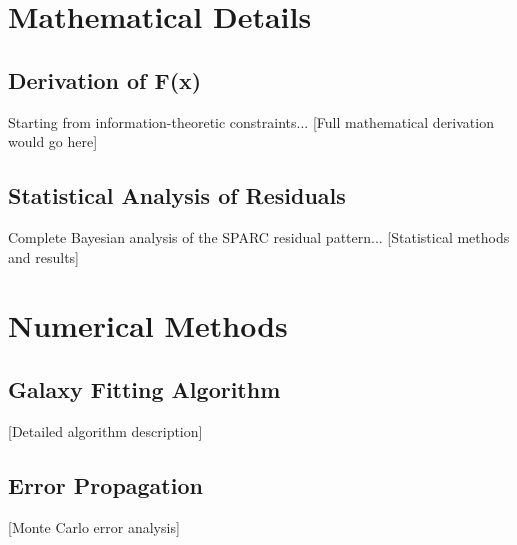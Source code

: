 \documentclass[12pt,a4paper]{article}
\begin{document}
\begin{appendices}

\section{Mathematical Details}

\subsection{Derivation of F(x)}

Starting from information-theoretic constraints...
[Full mathematical derivation would go here]

\subsection{Statistical Analysis of Residuals}

Complete Bayesian analysis of the SPARC residual pattern...
[Statistical methods and results]

\section{Numerical Methods}

\subsection{Galaxy Fitting Algorithm}

[Detailed algorithm description]

\subsection{Error Propagation}

[Monte Carlo error analysis]

\end{appendices}
\end{document}
